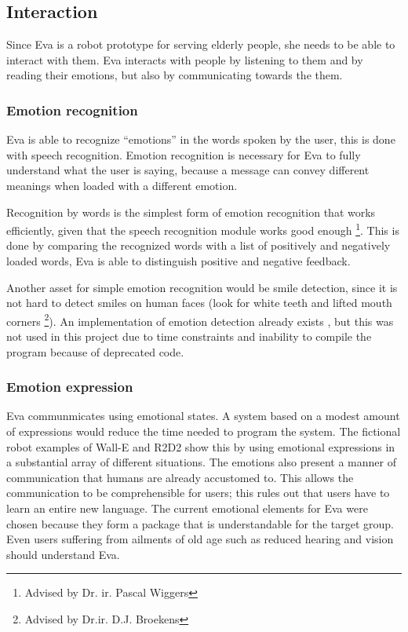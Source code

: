 \documentclass[project_eva.tex]{subfiles}
\begin{document}
\subsection*{Interaction}
Since Eva is a robot prototype for serving elderly people, she needs to be able to interact with them. Eva interacts with people by listening to them and by reading their emotions, but also by communicating towards the them.

\subsubsection*{Emotion recognition}
Eva is able to recognize ``emotions'' in the words spoken by the user, this is done with speech recognition. Emotion recognition is necessary for Eva to fully understand what the user is saying, because a message can convey different meanings when loaded with a different emotion.

Recognition by words is the simplest form of emotion recognition that works efficiently, given that the speech recognition module works good enough \footnote{Advised by Dr. ir. Pascal Wiggers}. This is done by comparing the recognized words with a list of positively and negatively loaded words, Eva is able to distinguish positive and negative feedback.

Another asset for simple emotion recognition would be smile detection, since it is not hard to detect smiles on human faces (look for white teeth and lifted mouth corners \footnote{Advised by Dr.ir. D.J. Broekens }). An implementation of emotion detection already exists \cite{autosmiley}, but this was not used in this project due to time 
constraints and inability to compile the program because of deprecated code.
 
\subsubsection*{Emotion expression}
\label{sec:Emotion expression}
Eva communmicates using emotional states. A system based on a modest amount of expressions would reduce the time needed 
to program the system. The fictional robot examples of Wall-E and R2D2 show this by using emotional expressions in a 
substantial array of different situations. The emotions also present a manner of communication that humans are already 
accustomed to. This allows the communication to be comprehensible for users; this rules out that users have
to learn an entire new language. The current emotional elements for Eva were chosen because they form a package that is
understandable for the target group. Even users suffering from ailments of old age such as reduced hearing and vision 
should understand Eva. 
\end{document}
